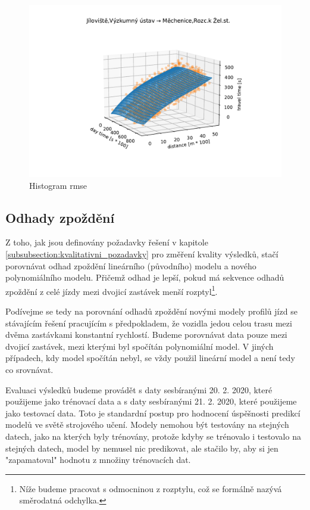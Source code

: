 \begin{figure}
   \centering
 \includegraphics[width=1\linewidth]{../img/thrd_degree}
 \caption{Histogram \gls{rmse}}
 \label{fig:thrd_degree}
\end{figure}




\subsection{Odhady zpoždění} \label{subsection:odhady_zpozdeni}


Z toho, jak jsou definovány požadavky řešení v kapitole \ref{subsubsection:kvalitativni_pozadavky} pro změření kvality výsledků, stačí porovnávat odhad zpoždění lineárního (původního) modelu a nového polynomiálního modelu. Přičemž odhad je lepší, pokud má sekvence odhadů zpoždění z celé jízdy mezi dvojicí zastávek menší rozptyl\footnote{Níže budeme pracovat s odmocninou z rozptylu, což se formálně nazývá směrodatná odchylka.}.


\bigbreak


Podívejme se tedy na porovnání odhadů zpoždění novými modely profilů jízd se stávajícím řešení pracujícím s předpokladem, že vozidla jedou celou trasu mezi dvěma zastávkami konstantní rychlostí. Budeme porovnávat data pouze mezi dvojicí zastávek, mezi kterými byl spočítán polynomiální model. V jiných případech, kdy model spočítán nebyl, se vždy použil lineární model a není tedy co srovnávat.


\bigbreak


Evaluaci výsledků budeme provádět s daty sesbíranými 20. 2. 2020, které použijeme jako trénovací data a s daty sesbíranými 21. 2. 2020, které použijeme jako testovací data. Toto je standardní postup pro hodnocení úspěšnosti predikcí modelů ve světě strojového učení. Modely nemohou být testovány na stejných datech, jako na kterých byly trénovány, protože kdyby se trénovalo i testovalo na stejných datech, model by nemusel nic predikovat, ale stačilo by, aby si jen "zapamatoval" hodnotu z množiny trénovacích dat.


